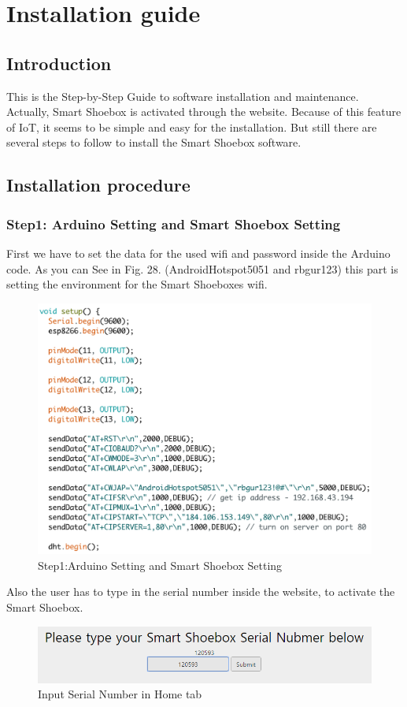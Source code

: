 \documentclass[conference]{IEEEtran}
\begin{document}
\section{Installation guide}
\subsection{Introduction}
This is the Step-by-Step Guide to software installation and maintenance. Actually, Smart Shoebox is activated through the website. Because of this feature of IoT, it seems to be simple and easy for the installation. But still there are several steps to follow to install the Smart Shoebox software.
\subsection{Installation procedure}
\subsubsection{Step1: Arduino Setting and Smart Shoebox Setting}
First we have to set the data for the used wifi and password inside the Arduino code. As you can See in Fig. 28.  (AndroidHotspot5051 and rbgur123) this part is setting the environment for the Smart Shoeboxes wifi.
\begin{figure}[H]
\begin{center}
    \includegraphics[scale=0.47]{step1}
    \caption{Step1:Arduino Setting and Smart Shoebox Setting} \label{fig:label}
\end{center}
\end{figure}
Also the user has to type in the serial number inside the website, to activate the Smart Shoebox.
\begin{figure}[H]
\begin{center}
    \includegraphics[scale=0.4]{jh0}
     \caption{Input Serial Number in Home tab}\label{fig:label}
\end{center}
\end{figure}
\end{document}
